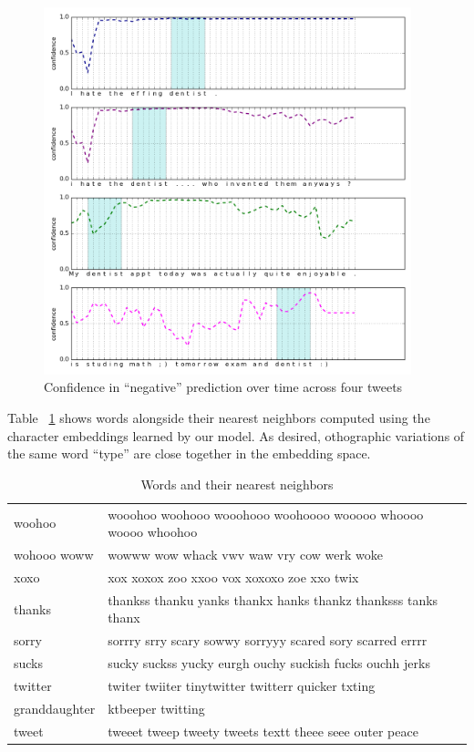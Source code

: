 \documentclass{article} %
\begin{document}
\begin{figure}[h!]

\begin{center}
\includegraphics[width=0.95\textwidth]{figs/dentist}
\end{center}
\caption{Confidence in ``negative'' prediction over time across four tweets}
\label{fig:dentist}
\end{figure}

Table ~\ref{table:word-sim} shows words alongside their nearest neighbors computed using the character embeddings learned by our model. As desired, othographic variations of the same word ``type'' are close together in the embedding space. 

\begin{table}[h!]
\begin{center}
\begin{tabular}{|l|l|}
\hline
woohoo &    wooohoo woohooo wooohooo woohoooo wooooo whoooo woooo whoohoo \\
wohooo
woww &   wowww wow whack vwv waw vry cow werk woke \\
xoxo &    xox xoxox zoo xxoo vox xoxoxo zoe xxo twix \\
thanks &    thankss thanku yanks thankx hanks thankz thanksss tanks thanx \\
sorry &    sorrry srry scary sowwy sorryyy scared sory scarred errrr \\
sucks &   sucky suckss yucky eurgh ouchy suckish fucks ouchh jerks \\
twitter &    twiter twiiter tinytwitter twitterr quicker txting \\
granddaughter & ktbeeper twitting \\
tweet  &  tweeet tweep tweety tweets textt theee seee outer peace \\
\hline
\end{tabular}
\end{center}
\caption{Words and their nearest neighbors}
\label{table:word-sim}
\end{table}
\end{document}
